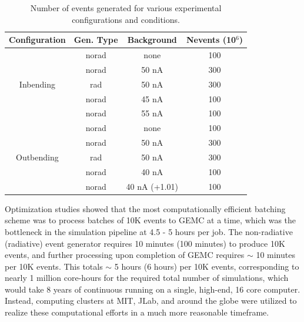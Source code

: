     \fi
    

    \begin{table}[htb]
        \centering
        \begin{tabular}{c|ccc}
            \textbf{Configuration} & \textbf{Gen. Type} & \textbf{Background} & \textbf{Nevents (10$^6$)} \\ \hline
                & norad & none & 100 \\
                & norad & 50 nA & 300 \\
            Inbending & rad & 50 nA & 300 \\
                & norad & 45 nA & 100 \\
                & norad & 55 nA & 100 \\ \hline
                & norad & none & 100 \\
                & norad &  50 nA & 300 \\
            Outbending & rad & 50 nA & 300 \\
                 & norad & 40 nA & 100 \\
             & norad & 40 nA (+1.01) & 100 \\
            \hline
        \end{tabular}
    \caption[Distribution of Generated Events by Configuration]{Number of events generated for various experimental configurations and conditions.} %
    \label{table:Generated_Data}
    \end{table}


    Optimization studies showed that the most computationally efficient batching scheme was to process batches of 10K events to GEMC at a time, which was the bottleneck in the simulation pipeline at 4.5 - 5 hours per job. The non-radiative (radiative) event generator requires 10 minutes (100 minutes) to produce 10K events, and further processing upon completion of GEMC requires $\sim$ 10 minutes per 10K events. This totals $\sim$ 5 hours (6 hours) per 10K events, corresponding to nearly 1 million core-hours for the required total number of simulations, which would take 8 years of continuous running on a single, high-end, 16 core computer. Instead, computing clusters at MIT, JLab, and around the globe were utilized to realize these computational efforts in a much more reasonable timeframe. 
    









